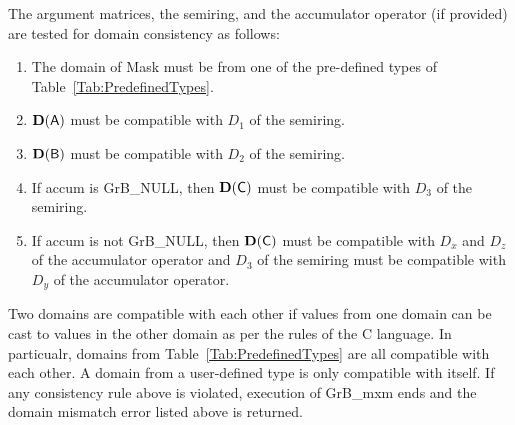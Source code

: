The argument matrices, the semiring, and the accumulator operator (if provided) are tested for domain consistency
as follows:
\begin{enumerate}

	\item The domain of {\sf Mask} must be from one of the pre-defined types of Table~\ref{Tab:PredefinedTypes}.

	\item $\bold{D}({\bf \sf A})$ must be compatible with $D_1$ of the semiring.

	\item $\bold{D}({\bf \sf B})$ must be compatible with $D_2$ of the semiring.

	\item If {\sf accum} is {\sf GrB\_NULL}, then $\bold{D}({\bf \sf C})$ must be compatible with $D_3$ of the semiring.

	\item If {\sf accum} is not {\sf GrB\_NULL}, then $\bold{D}({\bf \sf C})$ must be compatible with $D_x$ and $D_z$ of the 
	accumulator operator and $D_3$ of the semiring must be compatible with $D_y$ of the accumulator operator.

\end{enumerate}
Two domains are compatible with each other if values from one domain can be cast to values in the other domain as per the rules of the C language.
In particualr, domains from Table~\ref{Tab:PredefinedTypes} are all compatible with each other. A domain from a user-defined type is only compatible with itself.
If any consistency rule above is violated, execution of {\sf GrB\_mxm} ends and the domain mismatch error listed above is returned.


